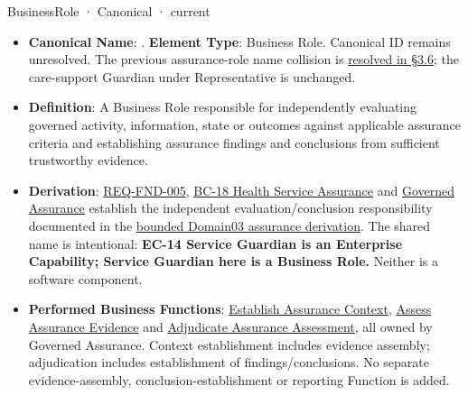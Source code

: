 \label{element:3ed945eeff23404d8dae43382ea746d1}
{\small BusinessRole · Canonical · current}\par

\begin{itemize}


\item \textbf{Canonical Name}: \texttt{}. \textbf{Element Type}: Business Role. Canonical ID remains unresolved. The previous assurance-role name collision is \href{\detokenize{../../../../../docs/markdown/03-business-architecture/actors-roles/roles.md#36-assurance-role-naming--resolved}}{resolved in §3.6}; the care-support Guardian under Representative is unchanged.

\item \textbf{Definition}: A Business Role responsible for independently evaluating governed activity, information, state or outcomes against applicable assurance criteria and establishing assurance findings and conclusions from sufficient trustworthy evidence.

\item \textbf{Derivation}: \hyperref[element:bbb7438e78604308abba93afc14f4e2e]{REQ-FND-005}, \href{\detokenize{../../../../../docs/markdown/02-strategy/capabilities/business-capabilities.md#18-health-service-assurance}}{BC-18 Health Service Assurance} and \href{\detokenize{../../../../../docs/markdown/02-strategy/capabilities/business-enabling-capabilities.md#governed-assurance}}{Governed Assurance} establish the independent evaluation/conclusion responsibility documented in the \href{\detokenize{../../../../../docs/markdown/03-business-architecture/behaviours/health-service-assurance.md}}{bounded Domain03 assurance derivation}. The shared name is intentional: \textbf{EC-14 Service Guardian is an Enterprise Capability; Service Guardian here is a Business Role.} Neither is a software component.

\item \textbf{Performed Business Functions}: \href{\detokenize{../../../../../docs/markdown/03-business-architecture/behaviours/health-service-assurance.md#establish-assurance-context}}{Establish Assurance Context}, \href{\detokenize{../../../../../docs/markdown/03-business-architecture/behaviours/health-service-assurance.md#assess-assurance-evidence}}{Assess Assurance Evidence} and \href{\detokenize{../../../../../docs/markdown/03-business-architecture/behaviours/health-service-assurance.md#adjudicate-assurance-assessment}}{Adjudicate Assurance Assessment}, all owned by Governed Assurance. Context establishment includes evidence assembly; adjudication includes establishment of findings/conclusions. No separate evidence-assembly, conclusion-establishment or reporting Function is added.


\end{itemize}
